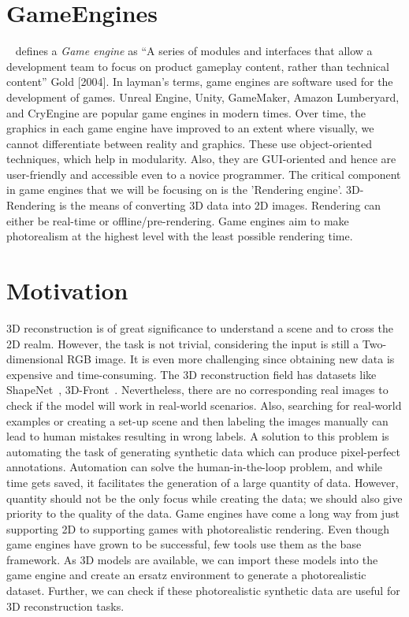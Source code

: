 \section{GameEngines}\label{sec:gameengines}
~\cite{10.5555/983334} defines a \emph{Game engine} as  “A series of modules and interfaces that allow a development team to focus on product gameplay content,
rather than technical content” Gold [2004].
In layman’s terms, game engines are software used for the development of games.
Unreal Engine, Unity, GameMaker, Amazon Lumberyard, and CryEngine are popular game engines in modern times.
Over time, the graphics in each game engine have improved to an extent where visually, we cannot differentiate between reality and graphics.
These use object-oriented techniques, which help in modularity.
Also, they are GUI-oriented and hence are user-friendly and accessible even to a novice programmer.
The critical component in game engines that we will be focusing on is the ’Rendering engine’.
3D-Rendering is the means of converting 3D data into 2D images.
Rendering can either be real-time or offline/pre-rendering.
Game engines aim to make photorealism at the highest level with the least possible rendering time.


\section{Motivation}\label{sec:Background and motivation}

3D reconstruction is of great significance to understand a scene and to cross the 2D realm.
However, the task is not trivial, considering the input is still a Two-dimensional RGB image.
It is even more challenging since obtaining new data is expensive and time-consuming.
The 3D reconstruction field has datasets like ShapeNet~\cite{chang2015shapenet}, 3D-Front~\cite{Fu20203DFRONT3F}.
Nevertheless, there are no corresponding real images to check if the model will work in real-world scenarios.
Also, searching for real-world examples or creating a set-up scene and then labeling the images manually can lead to human mistakes resulting in wrong labels.
A solution to this problem is automating the task of generating synthetic data which can produce pixel-perfect annotations.
Automation can solve the human-in-the-loop problem, and while time gets saved, it facilitates the generation of a large quantity of data.
However, quantity should not be the only focus while creating the data;
we should also give priority to the quality of the data.
Game engines have come a long way from just supporting 2D to supporting games with photorealistic rendering.
Even though game engines have grown to be successful, few tools use them as the base framework.
As 3D models are available, we can import these models into the game engine and create an ersatz environment to generate a photorealistic dataset.
Further, we can check if these photorealistic synthetic data are useful for 3D reconstruction tasks.


